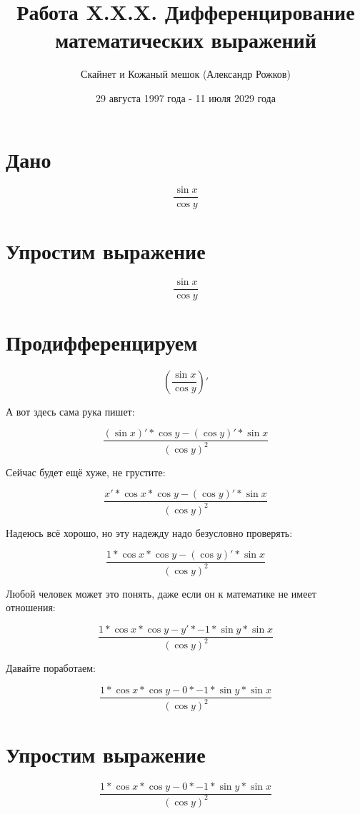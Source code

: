\documentclass[12pt]{article}
\title{Работа X.X.X. Дифференцирование математических выражений}
\author{Скайнет и Кожаный мешок (Александр Рожков)}
\date{29 августа 1997 года - 11 июля 2029 года}
\begin{document}
\maketitle
\newpage


\section{Дано}

$$ \frac{\sin{x  }  }{\cos{y  }  }  $$

\section{Упростим выражение}

$$ \frac{\sin{x  }  }{\cos{y  }  }  $$

\section{Продифференцируем}

$$ ( \frac{\sin{x  }  }{\cos{y  }  } )' $$

А вот здесь сама рука пишет:

$$ \frac{( \sin{x  } )' * \cos{y  }   - ( \cos{y  } )' * \sin{x  }    }{{( \cos{y  } ) }^{2  }  }  $$

Сейчас будет ещё хуже, не грустите:

$$ \frac{x ' * \cos{x  }   * \cos{y  }   - ( \cos{y  } )' * \sin{x  }    }{{( \cos{y  } ) }^{2  }  }  $$

Надеюсь всё хорошо, но эту надежду надо безусловно проверять:

$$ \frac{1  * \cos{x  }   * \cos{y  }   - ( \cos{y  } )' * \sin{x  }    }{{( \cos{y  } ) }^{2  }  }  $$

Любой человек может это понять, даже если он к математике не имеет отношения:

$$ \frac{1  * \cos{x  }   * \cos{y  }   - y ' * -1  * \sin{y  }    * \sin{x  }    }{{( \cos{y  } ) }^{2  }  }  $$

Давайте поработаем:

$$ \frac{1  * \cos{x  }   * \cos{y  }   - 0  * -1  * \sin{y  }    * \sin{x  }    }{{( \cos{y  } ) }^{2  }  }  $$

\section{Упростим выражение}

$$ \frac{1  * \cos{x  }   * \cos{y  }   - 0  * -1  * \sin{y  }    * \sin{x  }    }{{( \cos{y  } ) }^{2  }  }  $$
\end{document}
